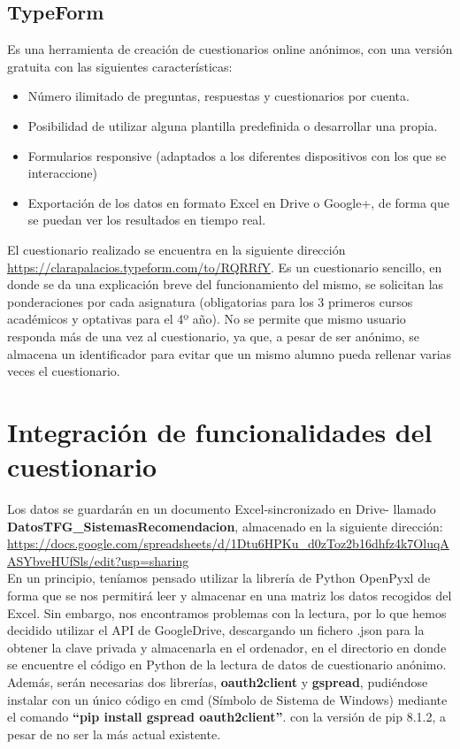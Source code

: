 \subsection{TypeForm}
Es una herramienta de creación de cuestionarios online anónimos, con una versión gratuita con las siguientes características: 
\begin{itemize}
\item Número ilimitado de preguntas, respuestas y cuestionarios por cuenta. 
\item Posibilidad de utilizar alguna plantilla predefinida o desarrollar una propia. 
\item Formularios responsive (adaptados a los diferentes dispositivos con los que se interaccione) 
\item Exportación de los datos en formato Excel en Drive o Google+, de forma que se puedan ver los resultados en tiempo real. 
\end{itemize}
El cuestionario realizado se encuentra en la siguiente dirección \url{https://clarapalacios.typeform.com/to/RQRRfY}. Es un cuestionario sencillo,  en donde se da una explicación breve del funcionamiento del mismo, se solicitan las ponderaciones por cada asignatura (obligatorias para los 3 primeros cursos académicos y optativas para el 4º año). No se permite que mismo usuario responda más de una vez al cuestionario, ya que, a pesar de ser anónimo, se almacena un identificador para evitar que un mismo alumno pueda rellenar varias veces el cuestionario.  	


\section{Integración de funcionalidades del cuestionario}
Los datos se guardarán en un documento Excel-sincronizado en Drive-  llamado  \textbf{DatosTFG\_SistemasRecomendacion}, almacenado en la siguiente dirección: \url{https://docs.google.com/spreadsheets/d/1Dtu6HPKu_d0zToz2b16dhfz4k7OluqAASYbveHUfSls/edit?usp=sharing} \\En un principio, teníamos pensado utilizar la librería de Python  OpenPyxl  de forma que se nos permitirá leer y almacenar en una matriz los datos recogidos del Excel. Sin embargo, nos encontramos problemas con la lectura, por lo que hemos decidido utilizar el API de GoogleDrive, descargando un fichero .json para la obtener la clave privada y almacenarla en el ordenador, en el directorio en donde se encuentre el código en Python de la lectura de datos de cuestionario anónimo. \\Además, serán necesarias dos librerías, \textbf{oauth2client} y \textbf{gspread}, pudiéndose instalar con un único código en cmd (Símbolo de Sistema de Windows)  mediante el comando \textbf{``pip install gspread oauth2client''}. \nocite{twilio:api}con la versión de pip 8.1.2, a pesar de no ser la más actual existente. 

